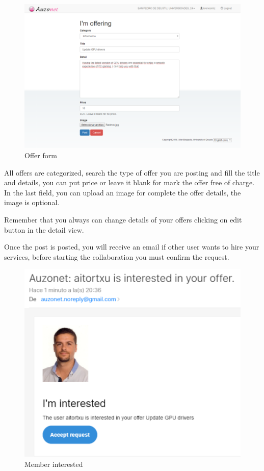 \documentclass{DeustoFDP}
\begin{document}
\begin{figure}[h!]
\centering
\includegraphics[width=0.9\linewidth]{fig/Manual/offerform}
\caption[Offer form]{Offer form}
\label{fig:offerform}
\end{figure}


All offers are categorized, search the type of offer you are posting and fill the title and details, you can put price or leave it blank for mark the offer free of charge. In the last field, you can upload an image for complete the offer details, the image is optional.

Remember that you always can change details of your offers clicking on edit button in the detail view.

Once the post is posted, you will receive an email if other user wants to hire your services, before starting the collaboration you must confirm the request.

\begin{figure}[h!]
\centering
\includegraphics[width=0.9\linewidth]{fig/Manual/memberinterested}
\caption[Member interested]{Member interested}
\label{fig:memberinterested}
\end{figure}
\end{document}
